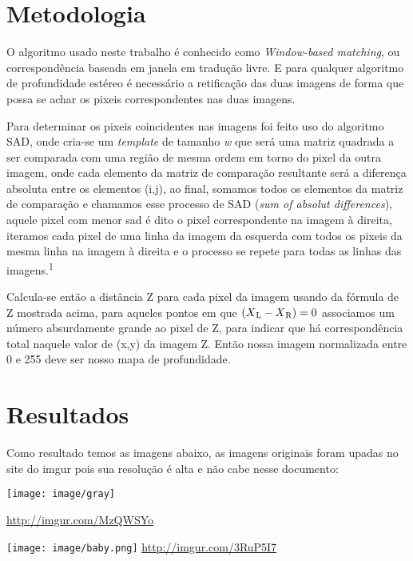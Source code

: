\documentclass[conference,harvard,brazil,english]{sbatex}
\begin{document}
	\section{Metodologia}
		\par O algoritmo usado neste trabalho é conhecido como \textit{Window-based matching}, ou correspondência baseada em janela em tradução livre. E para qualquer algoritmo de profundidade estéreo é necessário a retificação das duas imagens de forma que possa se achar os pixeis correspondentes nas duas imagens.
		\par Para determinar os pixeis coincidentes nas imagens foi feito uso do algoritmo SAD, onde cria-se um \textit{template} de tamanho \textit{w} que será uma matriz quadrada a ser comparada com uma região de mesma ordem em torno do pixel da outra imagem, onde cada elemento da matriz de comparação resultante será a diferença absoluta entre os elementos (i,j), ao final, somamos todos os elementos da matriz de comparação e chamamos esse processo de SAD (\textit{sum of absolut differences}), aquele pixel com menor sad é dito o pixel correspondente na imagem à direita, iteramos cada pixel de uma linha da imagem da esquerda com todos os pixeis da mesma linha na imagem à direita e o processo se repete para todas as linhas das imagens.\textsuperscript{1}
		\par Calcula-se então a distância Z para cada pixel da imagem usando da fórmula de Z mostrada acima, para aqueles pontos em que 
		$(X\textsubscript{L} - X\textsubscript{R}) = 0$ associamos um número absurdamente grande ao pixel de Z, para indicar que há correspondência total naquele valor de (x,y) da imagem Z. Então nossa imagem normalizada entre 0 e 255 deve ser nosso mapa de profundidade.
	\section{Resultados} 
		\par Como resultado temos as imagens abaixo, as imagens originais foram upadas no site do imgur pois sua resolução é alta e não cabe nesse documento:\newline
		\par\texttt{[image: image/gray]}\newline
			
				\url{http://imgur.com/MzQWSYo} \newline
		\par\texttt{[image: image/baby.png]}\newline
				\newline\url{http://imgur.com/3RuP5I7}\newline
			
\end{document}
